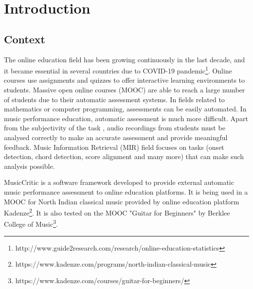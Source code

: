 \normallinespacing

\chapter{Introduction}

\section{Context}

The online education field has been growing continuously in the last decade, and it became essential in several countries due to COVID-19 pandemic\footnote{http://www.guide2research.com/research/online-education-statistics}. Online courses use assignments and quizzes to offer interactive learning environments to students. Massive open online courses (MOOC) are able to reach a large number of students due to their automatic assessment systems. In fields related to mathematics or computer programming, assessments can be easily automated. In music performance education, automatic assessment is much more difficult. Apart from the subjectivity of the task \cite{wesolowski2016examining}, audio recordings from students must be analysed correctly to make an accurate assessment and provide meaningful feedback. Music Information Retrieval (MIR) field focuses on tasks (onset detection, chord detection, score alignment and many more) that can make such analysis possible. 

MusicCritic \cite{bozkurt2018musiccritic} is a software framework developed to provide external automatic music performance assessment to online education platforms. It is being used in a MOOC for North Indian classical music provided by online education platform Kadenze\footnote{https://www.kadenze.com/programs/north-indian-classical-music}. It is also tested on the MOOC "Guitar for Beginners" by Berklee College of Music\footnote{https://www.kadenze.com/courses/guitar-for-beginners/}.  

